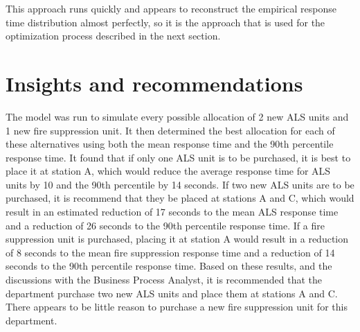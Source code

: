 \documentclass[article]{proc}
\begin{document}
This approach runs quickly and appears to reconstruct the empirical response time distribution almost perfectly, so it is the approach that is used for the optimization process described in the next section.


\section{Insights and recommendations}
The model was run to simulate every possible allocation of 2 new ALS units and 1 new fire suppression unit. It then determined the best allocation for each of these alternatives using both the mean response time and the 90th percentile response time. It found that if only one ALS unit is to be purchased, it is best to place it at station A, which would reduce the average response time for ALS units by 10 and the 90th percentile by 14 seconds. If two new ALS units are to be purchased, it is recommend that they be placed at stations A and C, which would result in an estimated reduction of 17 seconds to the mean ALS response time and a reduction of 26 seconds to the 90th percentile response time. If a fire suppression unit is purchased, placing it at station A would result in a reduction of 8 seconds to the mean fire suppression response time and a reduction of 14 seconds to the 90th percentile response time. Based on these results, and the discussions with the Business Process Analyst, it is recommended that the department purchase two new ALS units and place them at stations A and C. There appears to be little reason to purchase a new fire suppression unit for this department.



\scriptsize{

}
\end{document}
